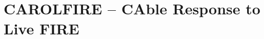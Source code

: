 \documentclass[11pt]{book}
\begin{document}


\newcommand{\dod}[2]{\frac{\partial #1}{\partial #2}}
\newcommand{\DoD}[2]{\frac{D #1}{D #2}}
\newcommand{\dsods}[2]{\frac{\partial^2 #1}{\partial #2^2}}
\newcommand{\dx}{\delta x}
\newcommand{\dy}{\delta y}
\newcommand{\dz}{\delta z}
\newcommand{\x}{x}
\newcommand{\y}{y}
\newcommand{\z}{z}
\newcommand{\dt}{\delta t}
\newcommand{\dn}{\delta n}
\newcommand{\cH}{{\cal H}}
\newcommand{\hu}{u}
\newcommand{\hv}{v}
\newcommand{\hw}{w}
\newcommand{\la}{\lambda}
\newcommand{\bO}{{\Omega}}
\newcommand{\bo}{{\bf \omega}}
\newcommand{\btau}{{\bf \tau}}
\newcommand{\bdelta}{{\bf \delta}}
\newcommand{\sumym}{\sum (Y_i/W_i)}
\newcommand{\oW}{\overline{W}}
\newcommand{\om}{\omega}
\newcommand{\omx}{\omega_x}
\newcommand{\omy}{\omega_y}
\newcommand{\omz}{\omega_z}
\newcommand{\erf}{\hbox{erf}}
\newcommand{\bF}{{\bf F}}
\newcommand{\bof}{{\bf f}}
\newcommand{\bq}{{\bf q}}
\newcommand{\br}{{\bf r}}
\newcommand{\bu}{{\bf u}}
\newcommand{\bx}{{\bf x}}
\newcommand{\bk}{{\bf k}}
\newcommand{\bv}{{\bf v}}
\newcommand{\bg}{{\bf g}}
\newcommand{\bn}{{\bf n}}
\newcommand{\bS}{{\bf S}}
\newcommand{\dS}{d{\bf S}}
\newcommand{\bs}{{\bf s}}
\newcommand{\bI}{{\bf I}}
\newcommand{\hp}{{\cal H}}
\newcommand{\trho}{\tilde{\rho}}
\newcommand{\dph}{{\delta\phi}}
\newcommand{\dth}{{\delta\theta}}
\newcommand{\tp}{\tilde{p}}
\newcommand{\dQ}{\dot{Q}}
\newcommand{\dq}{\dot{q}}
\newcommand{\dm}{\dot{m}}
\newcommand{\ha}{\frac{1}{2}}
\newcommand{\ft}{\frac{4}{3}}
\newcommand{\ot}{\frac{1}{3}}
\newcommand{\fofi}{\frac{4}{5}}
\newcommand{\of}{\frac{1}{4}}
\newcommand{\twth}{\frac{2}{3}}
\newcommand{\R}{{\cal R}}
\newcommand{\be}{\begin{equation}}
\newcommand{\ee}{\end{equation}}
\newcommand{\RE}{\hbox{Re}}
\newcommand{\LE}{\hbox{Le}}
\newcommand{\PR}{\hbox{Pr}}
\newcommand{\PE}{\hbox{Pe}}
\newcommand{\NU}{\hbox{Nu}}
\newcommand{\SC}{\hbox{Sc}}
\newcommand{\SH}{\hbox{Sh}}
\newcommand{\WE}{\hbox{We}}
\newcommand{\COTWO}{{\tiny \hbox{CO}_2}}
\newcommand{\OTWO}{{\tiny \hbox{O}_2}}
\newcommand{\CO}{{\tiny \hbox{CO}}}
\newcommand{\F}{{\tiny \hbox{F}}}

\pagestyle{empty}


\section{CAROLFIRE -- CAble Response to Live FIRE}
\end{document}
